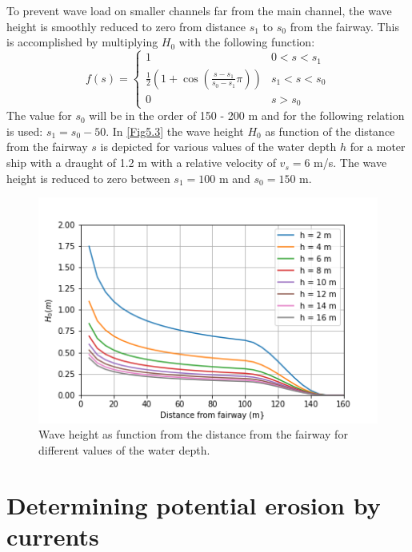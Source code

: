 \clearpage
To prevent wave load on smaller channels far from the main channel, the wave height is smoothly reduced to zero from distance $s_1$ to $s_0$ from the fairway.
This is accomplished by multiplying $H_0$ with the following function:
%
\begin{equation}
f(s) = \left \{ \begin{matrix}
1 & 0 < s < s_1 \\
\frac{1}{2}\left (1+\cos \left ( \frac{s - s_1}{s_0 - s_1} \pi \right ) \right ) & s_1 < s < s_0 \\
0 & s > s_0
\end{matrix} \right.
\end{equation}
%
The value for $s_0$ will be in the order of 150 - 200 m and for  the following relation is used: $s_1 = s_0 - 50$.
In \autoref{Fig5.3} the wave height $H_0$ as function of the distance from the fairway $s$ is depicted for various values of the water depth $h$ for a moter ship with a draught of 1.2 m with a relative velocity of $v_s = 6$ m/s.
The wave height is reduced to zero between $s_1 = 100$ m and $s_0 = 150$ m.

\begin{figure}[!hb]
\includegraphics[width=\textwidth]{figures/Fig5.3.png}
\caption{Wave height as function from the distance from the fairway for different values of the water depth.}
\label{Fig5.3}
\end{figure}


\clearpage
\section{Determining potential erosion by currents} \label{Sec4.2}

